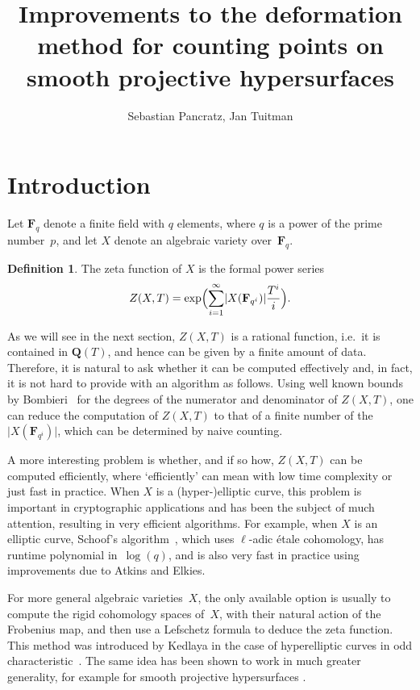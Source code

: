 \documentclass[a4paper,11pt]{article}
\author{Sebastian Pancratz, Jan Tuitman}
\title{Improvements to the deformation method for counting points 
on smooth projective hypersurfaces}
\numberwithin{equation}{section}
\providecommand{\card}[1]{\lvert#1\rvert}                %
\newcommand{\QQ}{\mathbf{Q}} %
\newcommand{\FF}{\mathbf{F}} %
\theoremstyle{definition}
\newtheorem{defn}[thm]{Definition}
\begin{document}
\maketitle

\tableofcontents


\section{Introduction}
\label{sec:Introduction}

Let $\FF_q$ denote a finite field with $q$ elements, where $q$ is a power of 
the prime number~$p$, and let $X$ denote an algebraic variety over~$\FF_q$. 

\begin{defn}
The zeta function of $X$ is the formal power series
\[
Z(X,T) = \exp \Bigl(\sum_{i=1}^{\infty} \card{X(\FF_{q^i})} \frac{T^i}{i} \Bigr).
\]
\end{defn}

As we will see in the next section, $Z(X,T)$ 
is a rational function, i.e.\ it is contained in $\QQ(T)$, and 
hence can be given by a finite amount of data. Therefore, it is natural 
to ask whether it can be computed effectively and, in fact, it is not 
hard to provide with an algorithm as follows. Using well known bounds 
by Bombieri~\citep{Bombieri1966} for the degrees of the numerator and 
denominator of $Z(X,T)$, one can reduce the computation of $Z(X,T)$ to that 
of a finite number of the $\card{X(\FF_{q^i})}$, which can be determined 
by naive counting.

A more interesting problem is whether, and if so how, $Z(X,T)$ can be 
computed efficiently, where `efficiently' can mean with low time complexity 
or just fast in practice. When $X$ is a (hyper-)elliptic curve, this problem
is important in cryptographic applications and has been the subject of 
much attention, resulting in very efficient algorithms.  For example, when 
$X$ is an elliptic curve, Schoof's algorithm~\citep{Schoof1995}, which uses 
$\ell$-adic \'etale cohomology, has runtime polynomial in~$\log(q)$, and is 
also very fast in practice using improvements due to Atkins and Elkies.

For more general algebraic varieties~$X$, the only available option is 
usually to compute the rigid cohomology spaces of~$X$, with their natural 
action of the Frobenius map, and then use a Lefschetz formula to deduce the 
zeta function. This method was introduced by Kedlaya in the case of 
hyperelliptic curves in odd characteristic~\citep{Kedlaya2001}.  The same 
idea has been shown to work in much greater generality, for example for 
smooth projective hypersurfaces \citep{AbbottKedlayaRoe2006}. 
\end{document}
